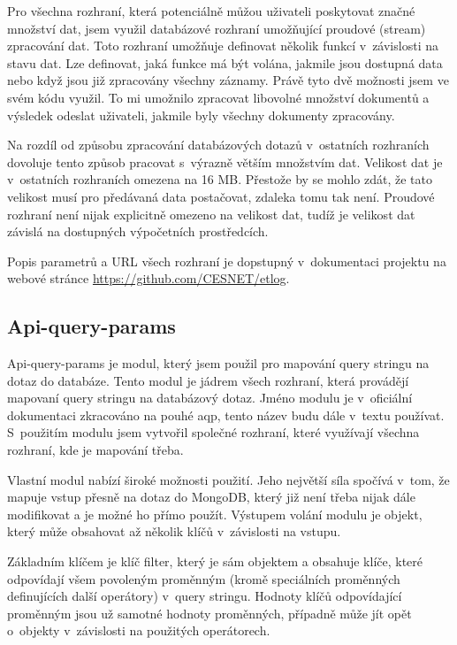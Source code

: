 \documentclass[thesis=M,czech]{FITthesis}[2012/06/26]
\begin{document}
    Pro všechna rozhraní, která potenciálně můžou uživateli
    poskytovat značné množství dat,
    jsem využil databázové rozhraní umožňující proudové (stream) zpracování dat.
    Toto rozhraní umožňuje definovat několik funkcí v~závislosti na stavu dat.
    Lze definovat, jaká funkce má být volána, jakmile jsou dostupná data
    nebo když jsou již zpracovány všechny záznamy.
    Právě tyto dvě možnosti jsem ve svém kódu využil.
    To mi umožnilo zpracovat libovolné množství dokumentů
    a výsledek odeslat uživateli, 
    jakmile byly všechny dokumenty zpracovány.

    Na rozdíl od způsobu zpracování
    databázových dotazů v~ostatních rozhraních
    dovoluje tento způsob pracovat s~výrazně větším množstvím dat.
    Velikost dat je v~ostatních rozhraních omezena na 16 MB.
    Přestože by se mohlo zdát, že tato velikost musí pro předávaná data postačovat,
    zdaleka tomu tak není.
    Proudové rozhraní není nijak explicitně omezeno na velikost dat,
    tudíž je velikost dat závislá na dostupných výpočetních prostředcích.

    Popis parametrů a URL všech rozhraní je dopstupný v~dokumentaci projektu
    na webové stránce \href{https://github.com/CESNET/etlog}{https://github.com/CESNET/etlog}.

    \subsection{Api-query-params}
    
      Api-query-params je modul, který jsem použil pro mapování
      query stringu na dotaz do databáze.
      Tento modul je jádrem všech rozhraní, která provádějí mapovaní query stringu na databázový dotaz.
      Jméno modulu je v~oficiální dokumentaci zkracováno na pouhé aqp, tento název budu dále v~textu používat.
      S~použitím modulu jsem vytvořil společné rozhraní, které využívají všechna rozhraní, kde je mapování třeba.

      Vlastní modul nabízí široké možnosti použití.
      Jeho největší síla spočívá v~tom, že mapuje vstup přesně na dotaz do MongoDB, 
      který již není třeba nijak dále modifikovat a je možné ho přímo použít.
      Výstupem volání modulu je objekt, který může obsahovat až několik klíčů v~závislosti
      na vstupu.

      Základním klíčem je klíč filter, který je sám objektem a obsahuje
      klíče, které odpovídají všem povoleným proměnným (kromě speciálních proměnných definujících další operátory) v~query stringu.
      Hodnoty klíčů odpovídající proměnným jsou už samotné hodnoty proměnných,
      případně může jít opět o~objekty v~závislosti na použitých operátorech.
\end{document}
